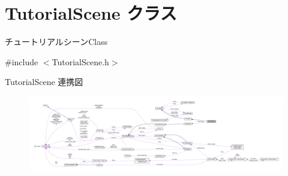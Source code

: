 \hypertarget{class_tutorial_scene}{}\section{Tutorial\+Scene クラス}
\label{class_tutorial_scene}


チュートリアルシーン\+Class  




{\ttfamily \#include $<$Tutorial\+Scene.\+h$>$}



Tutorial\+Scene 連携図\nopagebreak
\begin{figure}[H]
\begin{center}
\leavevmode
\includegraphics[width=350pt]{class_tutorial_scene__coll__graph}
\end{center}
\end{figure}
